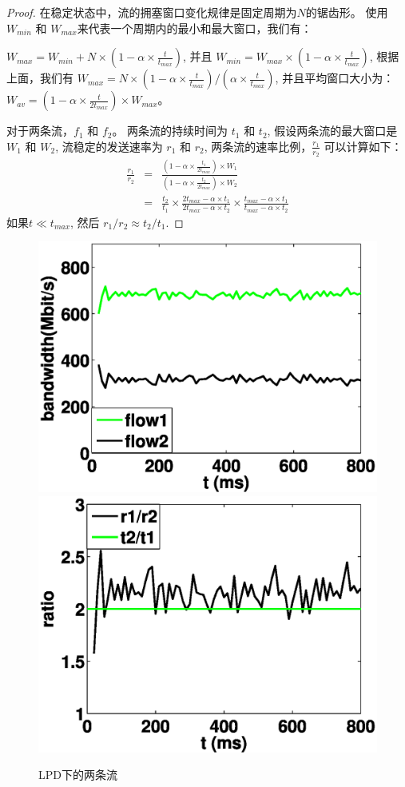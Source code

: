 \begin{proof}
在稳定状态中，流的拥塞窗口变化规律是固定周期为$N$的锯齿形。 
使用 $W_{min}$ 和 $W_{max}$来代表一个周期内的最小和最大窗口，我们有：

$W_{max}=W_{min}+N \times (1-\alpha \times \frac{t}{t_{max}})$, 
并且 $W_{min}=W_{max} \times (1- \alpha \times \frac{t}{t_{max}})$, 
根据上面，我们有
$W_{max}= N \times (1-\alpha \times \frac{t}{t_{max}})/(\alpha \times \frac{t}{t_{max}})$, 
并且平均窗口大小为： $W_{av}= (1- \alpha \times \frac{t}{2t_{max}}) \times W_{max}$。

对于两条流，$f_{1}$ 和 $f_{2}$。
两条流的持续时间为 $t_{1}$ 和 $t_{2}$, 
假设两条流的最大窗口是$W_{1}$ 和 $W_{2}$, 
流稳定的发送速率为 $r_{1}$ 和 $r_{2}$, 
 两条流的速率比例，$\frac{r_{1}}{r_{2}}$ 可以计算如下：
\begin{eqnarray}
\frac{r_{1}}{r_{2}} &=& \frac{(1-\alpha \times \frac{t_{1}}{2t_{max}}) \times W_{1}}{(1-\alpha \times \frac{t_{2}}{2t_{max}}) \times W_{2}} \nonumber \\
&=& \frac{t_{2}}{t_{1}} \times \frac{2t_{max}-\alpha \times t_{1}}{2t_{max}-\alpha \times t_{2}} \times \frac{t_{max}-\alpha \times t_{1}}{t_{max}-\alpha \times t_{2}} \nonumber
\end{eqnarray}
如果$t \ll t_{max}$, 然后 $r_{1}/r_{2} \approx t_{2}/t_{1}$.
\end{proof}

\begin{figure}[h]
\centering
{}
 {\includegraphics[width=0.45\columnwidth]{figures/LPD/rate2.eps}}
{\includegraphics[width=0.45\columnwidth]{figures/LPD/ratio.eps}}
\caption{LPD下的两条流}
\label{rate-analysis-fig}
\end{figure}

